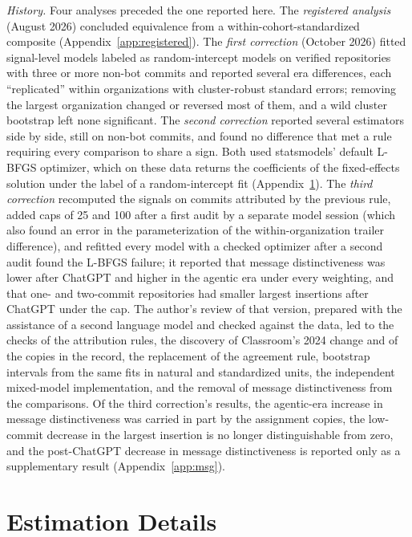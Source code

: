 \documentclass[acmsmall,screen,review,anonymous]{acmart}
\begin{document}
\textit{History.} Four analyses preceded the one reported here. The \textit{registered analysis} (August 2026) concluded equivalence from a within-cohort-standardized composite (Appendix~\ref{app:registered}). The \textit{first correction} (October 2026) fitted signal-level models labeled as random-intercept models on verified repositories with three or more non-bot commits and reported several era differences, each ``replicated'' within organizations with cluster-robust standard errors; removing the largest organization changed or reversed most of them, and a wild cluster bootstrap left none significant. The \textit{second correction} reported several estimators side by side, still on non-bot commits, and found no difference that met a rule requiring every comparison to share a sign. Both used statsmodels' default L-BFGS optimizer, which on these data returns the coefficients of the fixed-effects solution under the label of a random-intercept fit (Appendix~\ref{app:estimation}). The \textit{third correction} recomputed the signals on commits attributed by the previous rule, added caps of 25 and 100 after a first audit by a separate model session (which also found an error in the parameterization of the within-organization trailer difference), and refitted every model with a checked optimizer after a second audit found the L-BFGS failure; it reported that message distinctiveness was lower after ChatGPT and higher in the agentic era under every weighting, and that one- and two-commit repositories had smaller largest insertions after ChatGPT under the cap. The author's review of that version, prepared with the assistance of a second language model and checked against the data, led to the checks of the attribution rules, the discovery of Classroom's 2024 change and of the copies in the record, the replacement of the agreement rule, bootstrap intervals from the same fits in natural and standardized units, the independent mixed-model implementation, and the removal of message distinctiveness from the comparisons. Of the third correction's results, the agentic-era increase in message distinctiveness was carried in part by the assignment copies, the low-commit decrease in the largest insertion is no longer distinguishable from zero, and the post-ChatGPT decrease in message distinctiveness is reported only as a supplementary result (Appendix~\ref{app:msg}).

\section{Estimation Details}
\label{app:estimation}
\end{document}
